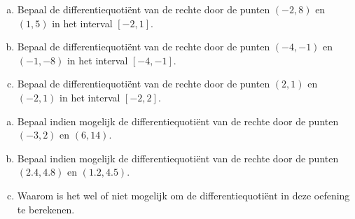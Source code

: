 \documentclass[12pt]{article}
\begin{document}
\begin{oefening}
\begin{enumerate}[(a)]
  \item Bepaal de differentiequotiënt van de rechte door de punten $(-2,8)$ en $(1,5)$ in het interval $[-2,1]$.
  \item Bepaal de differentiequotiënt van de rechte door de punten $(-4,-1)$ en $(-1,-8)$ in het interval $[-4,-1]$.
  \item Bepaal de differentiequotiënt van de rechte door de punten $(2,1)$ en $(-2,1)$ in het interval $[-2,2]$.
\end{enumerate}
\end{oefening}

\begin{oefening}
\begin{enumerate}[(a)]
  \item Bepaal indien mogelijk de differentiequotiënt van de rechte door de punten $(-3,2)$ en $(6,14)$.
  \item Bepaal indien mogelijk de differentiequotiënt van de rechte door de punten $(2.4,4.8)$ en $(1.2,4.5)$.
  \item Waarom is het wel of niet mogelijk om de differentiequotiënt in deze oefening te berekenen.\end{enumerate}
\end{oefening}
\end{document}

